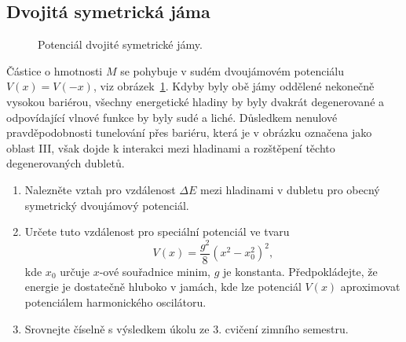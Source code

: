 \subsection{Dvojitá symetrická jáma}
	\begin{figure}[!htbp]
	\centering
	\caption{
		Potenciál dvojité symetrické jámy.
	}
	\label{fig:DoubleWell}
	\end{figure}	

	Částice o hmotnosti $M$ se pohybuje v sudém dvoujámovém potenciálu $V(x)=V(-x)$, viz obrázek~\ref{fig:DoubleWell}.
	Kdyby byly obě jámy oddělené nekonečně vysokou bariérou, 
	všechny energetické hladiny by byly dvakrát degenerované a odpovídající vlnové funkce by byly sudé a liché.
	Důsledkem nenulové pravděpodobnosti tunelování přes bariéru, která je v obrázku označena jako oblast III, 
	však dojde k interakci mezi hladinami a rozštěpení těchto degenerovaných dubletů.	
	\begin{enumerate}
	\item
		Nalezněte vztah pro vzdálenost $\Delta E$ mezi hladinami v dubletu pro obecný symetrický dvoujámový potenciál.
		
	\item
		Určete tuto vzdálenost pro speciální potenciál ve tvaru
		\begin{equation}
			\label{eq:DoubleWellPotential}
			V(x)=\frac{g^{2}}{8}\left(x^{2}-x_{0}^{2}\right)^{2},
		\end{equation}
		kde $x_{0}$ určuje $x$-ové souřadnice minim, $g$ je konstanta.
		Předpokládejte, že energie je dostatečně hluboko v jamách, kde lze potenciál $V(x)$ aproximovat potenciálem harmonického oscilátoru.
	
	\item
		Srovnejte číselně s výsledkem úkolu ze 3. cvičení zimního semestru.	
	\end{enumerate}


